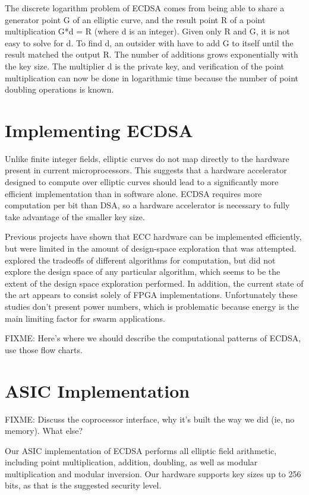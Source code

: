 \documentclass[twocolumn]{article}
\begin{document}
The discrete logarithm problem of ECDSA comes from being able to share a generator point
G of an elliptic curve, and the result point R of a point multiplication G*d = R 
(where d is an integer). Given only R and G, it is not easy to solve for d. To find d, an
outsider with have to add G to itself until the result matched the output R. The number
of additions grows exponentially with the key size. The multiplier d is the private key, 
and verification of the point multiplication can now be done in logarithmic time because
the number of point doubling operations is known. 

\section{Implementing ECDSA}

Unlike finite integer fields, elliptic curves do not map directly to
the hardware present in current microprocessors\cite{kss-ecdsa}. This
suggests that a hardware accelerator designed to compute over elliptic
curves should lead to a significantly more efficient implementation
than in software alone.  ECDSA requires more computation per bit than
DSA, so a hardware accelerator is necessary to fully take advantage of
the smaller key size.

Previous projects\cite{nnll-ecdsa_hw} have shown that ECC hardware can
be implemented efficiently, but were limited in the amount of
design-space exploration that was attempted.  \cite{mmm-hw_ecc}
explored the tradeoffs of different algorithms for computation, but
did not explore the design space of any particular algorithm, which
seems to be the extent of the design space exploration performed.  In
addition, the current state of the art appears to consist solely of
FPGA implementations.  Unfortunately these studies don't present power
numbers, which is problematic because energy is the main limiting
factor for swarm applications.

FIXME: Here's where we should describe the computational patterns of
ECDSA, use those flow charts.

\section{ASIC Implementation}

FIXME: Discuss the coprocessor interface, why it's built the way we
did (ie, no memory).  What else?

Our ASIC implementation of ECDSA performs all elliptic field arithmetic,
including point multiplication, addition, doubling, as well as modular
multiplication and modular inversion. Our hardware supports key sizes
up to 256 bits, as that is the suggested security level.
\end{document}
